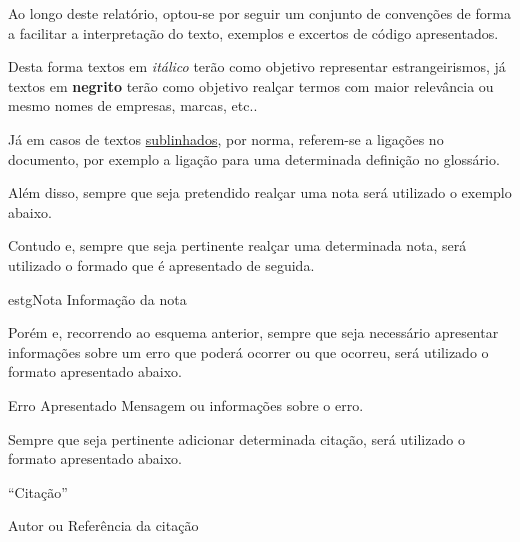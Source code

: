 
Ao longo deste relatório, optou-se por seguir um conjunto de convenções de forma a facilitar a interpretação do texto, exemplos e excertos de código apresentados.

Desta forma textos em \textit{itálico} terão como objetivo representar estrangeirismos, já textos em \textbf{negrito} terão como objetivo realçar termos com maior relevância ou mesmo nomes de empresas, marcas, etc..

Já em casos de textos \underline{sublinhados}, por norma, referem-se a ligações no documento, por exemplo a ligação para uma determinada definição no glossário.

Além disso, sempre que seja pretendido realçar uma nota será utilizado o exemplo abaixo.

Contudo e, sempre que seja pertinente realçar uma determinada nota, será utilizado o formado que é apresentado de seguida.

\vspace{0.01cm}

\begin{mybox}{estg}{Nota}
	Informação da nota
\end{mybox}

\vspace{0.1cm}

Porém e, recorrendo ao esquema anterior, sempre que seja necessário apresentar informações sobre um erro que poderá ocorrer ou que ocorreu, será utilizado o formato apresentado abaixo.

\vspace{0.01cm}

\begin{errorbox}{Erro Apresentado}
Mensagem ou informações sobre o erro.
\end{errorbox}

\vspace{0.1cm}

Sempre que seja pertinente adicionar determinada citação, será utilizado o formato apresentado abaixo.

\begin{flushright}
	\begin{quotebox50}
		``Citação''

		\tcblower

		Autor ou Referência da citação
	\end{quotebox50}
\end{flushright}

\vspace{0.1cm}

